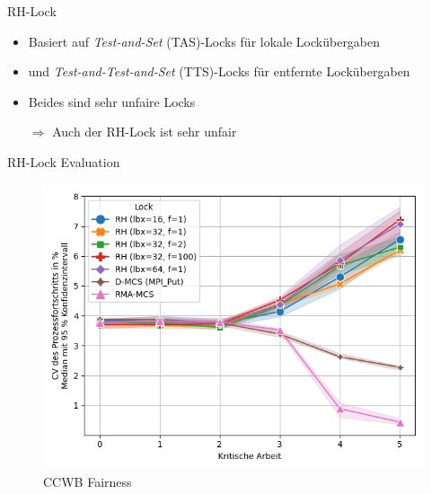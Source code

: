 \documentclass[fleqn,compress,utf8,aspectratio=169,t]{beamer}
\begin{document}
\begin{frame}{RH-Lock}
    \begin{itemize}
        \item Basiert auf \textit{Test-and-Set} (TAS)-Locks für lokale Lockübergaben
        \item und \textit{Test-and-Test-and-Set} (TTS)-Locks für entfernte Lockübergaben
        \item Beides sind sehr unfaire Locks \pause
        \item[$\Rightarrow$] Auch der RH-Lock ist sehr unfair
    \end{itemize}
\end{frame}

\begin{frame}{RH-Lock Evaluation}
    \begin{minipage}{.49\textwidth}
        \begin{figure}
            \includegraphics[width=\textwidth]{../../Dokumentation/Latex/Bilder/benchmarks/intelmpi/rh/CCWB-processes=112-fairness}
            \caption{CCWB Fairness}
        \end{figure}
    \end{minipage}
    \begin{minipage}{.49\textwidth}
        \begin{figure}

\end{figure}
\end{minipage}
\end{frame}
\end{document}

